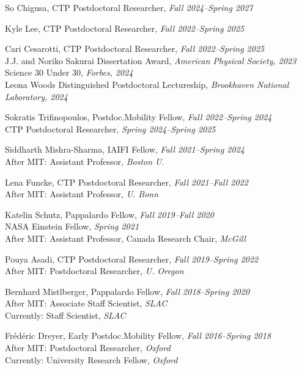 \bbl

\item So Chigusa, CTP Postdoctoral Researcher, \emph{Fall 2024--Spring 2027}

\item Kyle Lee, CTP Postdoctoral Researcher, \emph{Fall 2022--Spring 2025}

\item Cari Cesarotti, CTP Postdoctoral Researcher, \emph{Fall 2022--Spring 2025}
\\ J.J. and Noriko Sakurai Dissertation Award, \emph{American Physical Society, 2023}
\\ Science 30 Under 30, \emph{Forbes, 2024}
\\ Leona Woods Distinguished Postdoctoral Lectureship, \emph{Brookhaven National Laboratory, 2024}

\item Sokratis Trifinopoulos, Postdoc.Mobility Fellow, \emph{Fall 2022--Spring 2024}
\\ CTP Postdoctoral Researcher, \emph{Spring 2024--Spring 2025}

\item Siddharth Mishra-Sharma, IAIFI Fellow, \emph{Fall 2021--Spring 2024}
\\ After MIT: Assistant Professor, \emph{Boston U.}

\item Lena Funcke, CTP Postdoctoral Researcher, \emph{Fall 2021--Fall 2022}
\\ After MIT: Assistant Professor, \emph{U. Bonn}

\item Katelin Schutz, Pappalardo Fellow, \emph{Fall 2019--Fall 2020}
\\ NASA Einstein Fellow, \emph{Spring 2021}
\\ After MIT: Assistant Professor, Canada Research Chair, \emph{McGill}

\item Pouya Asadi, CTP Postdoctoral Researcher, \emph{Fall 2019--Spring 2022}
\\ After MIT: Postdoctoral Researcher, \emph{U. Oregon}

\item Bernhard Mistlberger, Pappalardo Fellow, \emph{Fall 2018--Spring 2020}
\\ After MIT: Associate Staff Scientist, \emph{SLAC}
\\ Currently: Staff Scientist, \emph{SLAC}

\item Frédéric Dreyer, Early Postdoc.Mobility Fellow, \emph{Fall 2016--Spring 2018}
\\ After MIT: Postdoctoral Researcher, \emph{Oxford}
\\ Currently: University Research Fellow, \emph{Oxford}

